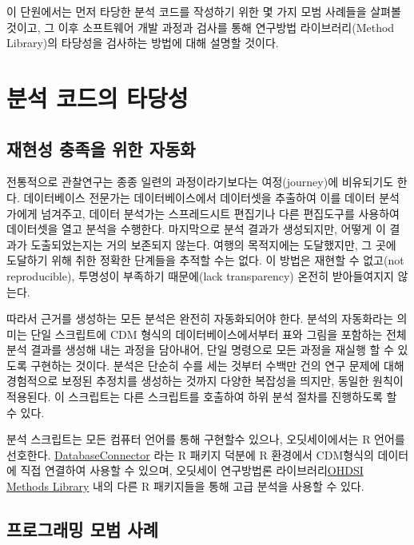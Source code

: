 \documentclass[11pt]{book}
\theoremstyle{definition}
\theoremstyle{definition}
\theoremstyle{definition}
\theoremstyle{remark}
\begin{document}
이 단원에서는 먼저 타당한 분석 코드를 작성하기 위한 몇 가지 모범
사례들을 살펴볼 것이고, 그 이후 소프트웨어 개발 과정과 검사를 통해
연구방법 라이브러리(Method Library)의 타당성을 검사하는 방법에 대해
설명할 것이다. 

\section{분석 코드의 타당성}\label{--}

\subsection{재현성 충족을 위한 자동화}\label{automation}

전통적으로 관찰연구는 종종 일련의 과정이라기보다는 여정(journey)에
비유되기도 한다. 데이터베이스 전문가는 데이터베이스에서 데이터셋을
추출하여 이를 데이터 분석가에게 넘겨주고, 데이터 분석가는 스프레드시트
편집기나 다른 편집도구를 사용하여 데이터셋을 열고 분석을 수행한다.
마지막으로 분석 결과가 생성되지만, 어떻게 이 결과가 도출되었는지는 거의
보존되지 않는다. 여행의 목적지에는 도달했지만, 그 곳에 도달하기 위해
취한 정확한 단계들을 추적할 수는 없다. 이 방법은 재현할 수 없고(not
reproducible), 투명성이 부족하기 때문에(lack transparency) 온전히
받아들여지지 않는다. 

따라서 근거를 생성하는 모든 분석은 완전히 자동화되어야 한다. 분석의
자동화라는 의미는 단일 스크립트에 CDM 형식의 데이터베이스에서부터 표와
그림을 포함하는 전체 분석 결과를 생성해 내는 과정을 담아내어, 단일
명령으로 모든 과정을 재실행 할 수 있도록 구현하는 것이다. 분석은 단순히
수를 세는 것부터 수백만 건의 연구 문제에 대해 경험적으로 보정된 추정치를
생성하는 것까지 다양한 복잡성을 띄지만, 동일한 원칙이 적용된다. 이
스크립트는 다른 스크립트를 호출하여 하위 분석 절차를 진행하도록 할 수
있다.

분석 스크립트는 모든 컴퓨터 언어를 통해 구현할수 있으나, 오딧세이에서는
R 언어를 선호한다.
\href{https://ohdsi.github.io/DatabaseConnector/}{DatabaseConnector}
라는 R 패키지 덕분에 R 환경에서 CDM형식의 데이터에 직접 연결하여 사용할
수 있으며, 오딧세이 연구방법론
라이브러리\href{https://ohdsi.github.io/MethodsLibrary/}{OHDSI Methods
Library} 내의 다른 R 패키지들을 통해 고급 분석을 사용할 수 있다.

\subsection{프로그래밍 모범 사례}\label{--}
\end{document}
